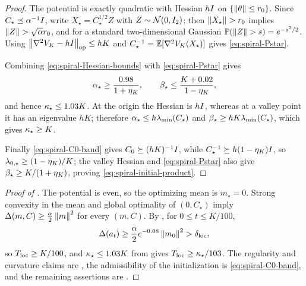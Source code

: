 \begin{proof}
    The potential is exactly quadratic with Hessian $hI$ on $\{\left\lVert \theta\right\rVert\leq r_0\}$. Since
    $C_\star\preceq\alpha^{-1}I$, write $X_\star=C_\star^{1/2}Z$ with $Z\sim\mathcal{N}(0,I_2)$;
    then $\left\lVert X_\star\right\rVert>r_0$ implies $\left\lVert Z\right\rVert>\sqrt\alpha r_0$, and for a standard
    two-dimensional Gaussian $\mathbb{P}(\left\lVert Z\right\rVert>s)=e^{-s^2/2}$. Using
    $\left\lVert \nabla^2V_K-hI\right\rVert_{\mathrm{op}}\leq hK$ and $C_\star^{-1}=\mathbb{E}[\nabla^2V_K(X_\star)]$ gives
    \eqref{eq:spiral-Pstar}.

    Combining \eqref{eq:spiral-Hessian-bounds} with \eqref{eq:spiral-Pstar} gives
    \begin{equation*}
        \alpha_\star\geq\frac{0.98}{1+\eta_K},
        \qquad
        \beta_\star\leq\frac{K+0.02}{1-\eta_K},
    \end{equation*}
    and hence $\kappa_\star\leq1.03K$. At the origin the Hessian is $hI$, whereas at a valley
    point it has an eigenvalue $hK$; therefore
    $\alpha_\star\leq h\lambda_{\min}(C_\star)$ and $\beta_\star\geq hK\lambda_{\min}(C_\star)$,
    which gives $\kappa_\star\geq K$.

    Finally \eqref{eq:spiral-C0-band} gives $C_0\succeq(hK)^{-1}I$, while
    $C_\star^{-1}\succeq h(1-\eta_K)I$, so $\lambda_{0,\star}\geq(1-\eta_K)/K$; the valley Hessian and
    \eqref{eq:spiral-Pstar} also give $\beta_\star\geq K/(1+\eta_K)$, proving
    \eqref{eq:spiral-initial-product}.
\end{proof}

\begin{proof}[Proof of ]
    The potential is even, so the optimizing mean is $m_\star=0$. Strong convexity in the mean
    and global optimality of $(0,C_\star)$ imply
    $\Delta(m,C)\geq\tfrac\alpha2\left\lVert m\right\rVert^2$ for every $(m,C)$. By ,
    for $0\leq t\leq K/100$,
    \begin{equation*}
        \Delta(a_t)
        \geq\frac\alpha2e^{-0.08}\left\lVert m_0\right\rVert^2
        >\delta_{\mathrm{loc}},
    \end{equation*}
    so $T_{\mathrm{loc}}\geq K/100$, and $\kappa_\star\leq1.03K$ from  gives
    $T_{\mathrm{loc}}\geq\kappa_\star/103$. The regularity and curvature claims are
    , the admissibility of the initialization is
    \eqref{eq:spiral-C0-band}, and the remaining assertions are .
\end{proof}

